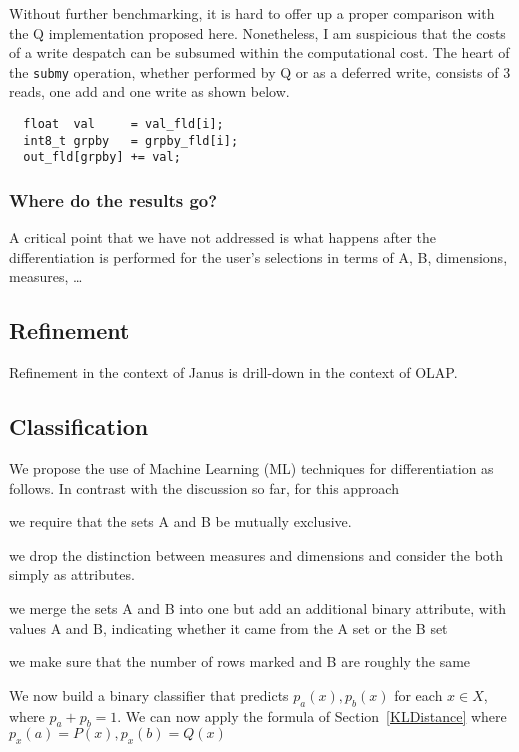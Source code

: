 Without further benchmarking, it is hard to offer up a proper comparison with
the Q implementation proposed here. Nonetheless, I am suspicious that the costs
of a write despatch can be subsumed within the computational cost. The heart of
the {\tt submy} operation, whether performed by Q or as a deferred write,
consists of 3 reads, one add and one write as shown below.
\begin{verbatim}
  float  val     = val_fld[i];
  int8_t grpby   = grpby_fld[i];
  out_fld[grpby] += val;
\end{verbatim}

\subsubsection{Where do the results go?}

A critical point that we have not addressed is what happens after the
differentiation is performed for the user's selections in terms of A, B,
dimensions, measures, \ldots

\TBC

\subsection{Refinement}
\label{Refinement}

Refinement in the context of Janus is drill-down in the context of OLAP. 


\TBC

\subsection{Classification}
\label{Classification}

We propose the use of Machine Learning (ML) techniques for differentiation as
follows. 
In contrast with the discussion so far, for this approach
\be
\item we require that the sets A and B be mutually exclusive.
\item we drop the distinction between measures and dimensions and
consider the both simply as attributes.
\item we merge the sets A and B into one but add an additional 
binary attribute, with values A and B, indicating whether it came from the A set
or the B set
\item we make sure that the number of rows marked and B are roughly the same
\ee

We now build a binary classifier that predicts \(p_a(x), p_b(x)\) for each \(x \in
X\), where \(p_a + p_b = 1\). We can now apply the formula of
Section~\ref{KLDistance} where \(p_x(a) = P(x), p_x(b) = Q(x)\)

